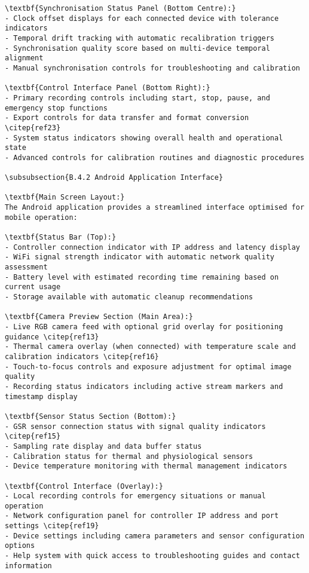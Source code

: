 \begin{verbatim}
\textbf{Synchronisation Status Panel (Bottom Centre):}
- Clock offset displays for each connected device with tolerance indicators
- Temporal drift tracking with automatic recalibration triggers
- Synchronisation quality score based on multi-device temporal alignment
- Manual synchronisation controls for troubleshooting and calibration

\textbf{Control Interface Panel (Bottom Right):}
- Primary recording controls including start, stop, pause, and emergency stop functions
- Export controls for data transfer and format conversion \citep{ref23}
- System status indicators showing overall health and operational state
- Advanced controls for calibration routines and diagnostic procedures

\subsubsection{B.4.2 Android Application Interface}

\textbf{Main Screen Layout:}
The Android application provides a streamlined interface optimised for mobile operation:

\textbf{Status Bar (Top):}
- Controller connection indicator with IP address and latency display
- WiFi signal strength indicator with automatic network quality assessment
- Battery level with estimated recording time remaining based on current usage
- Storage available with automatic cleanup recommendations

\textbf{Camera Preview Section (Main Area):}
- Live RGB camera feed with optional grid overlay for positioning guidance \citep{ref13}
- Thermal camera overlay (when connected) with temperature scale and calibration indicators \citep{ref16}
- Touch-to-focus controls and exposure adjustment for optimal image quality
- Recording status indicators including active stream markers and timestamp display

\textbf{Sensor Status Section (Bottom):}
- GSR sensor connection status with signal quality indicators \citep{ref15}
- Sampling rate display and data buffer status
- Calibration status for thermal and physiological sensors
- Device temperature monitoring with thermal management indicators

\textbf{Control Interface (Overlay):}
- Local recording controls for emergency situations or manual operation
- Network configuration panel for controller IP address and port settings \citep{ref19}
- Device settings including camera parameters and sensor configuration options
- Help system with quick access to troubleshooting guides and contact information


\end{verbatim}
